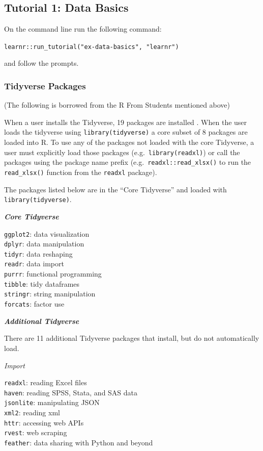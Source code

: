\documentclass[]{book}
\begin{document}
\hypertarget{tutorial-1-data-basics}{%
\subsection{Tutorial 1: Data Basics}\label{tutorial-1-data-basics}}

On the command line run the following command:

\texttt{learnr::run\_tutorial("ex-data-basics",\ "learnr")}

and follow the prompts.

\hypertarget{tidyverse-packages}{%
\subsubsection{Tidyverse Packages}\label{tidyverse-packages}}

(The following is borrowed from the R From Students mentioned above)

When a user installs the Tidyverse, 19 packages are installed . When the user loads the tidyverse using \texttt{library(tidyverse)} a core subset of 8 packages are loaded into R. To use any of the packages not loaded with the core Tidyverse, a user must explicitly load those packages (e.g.~\texttt{library(readxl)}) or call the packages using the package name prefix (e.g.~\texttt{readxl::read\_xlsx()} to run the \texttt{read\_xlsx()} function from the \texttt{readxl} package).

The packages listed below are in the ``Core Tidyverse'' and loaded with \texttt{library(tidyverse)}.

\textbf{\emph{Core Tidyverse}}

\texttt{ggplot2}: data visualization\\
\texttt{dplyr}: data manipulation\\
\texttt{tidyr}: data reshaping\\
\texttt{readr}: data import\\
\texttt{purrr}: functional programming\\
\texttt{tibble}: tidy dataframes\\
\texttt{stringr}: string manipulation\\
\texttt{forcats}: factor use

\textbf{\emph{Additional Tidyverse}}

There are 11 additional Tidyverse packages that install, but do not automatically load.

\emph{Import}

\texttt{readxl}: reading Excel files\\
\texttt{haven}: reading SPSS, Stata, and SAS data\\
\texttt{jsonlite}: manipulating JSON\\
\texttt{xml2}: reading xml\\
\texttt{httr}: accessing web APIs\\
\texttt{rvest}: web scraping\\
\texttt{feather}: data sharing with Python and beyond
\end{document}
